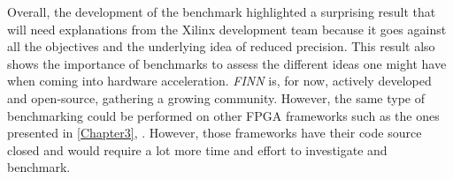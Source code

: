 Overall, the development of the benchmark highlighted a surprising result that will need explanations from the Xilinx development team because it goes against all the objectives and the underlying idea of reduced precision. This result also shows the importance of benchmarks to assess the different ideas one might have when coming into hardware acceleration. \emph{FINN} is, for now, actively developed and open-source, gathering a growing community. However, the same type of benchmarking could be performed on other FPGA frameworks such as the ones presented in \ref{Chapter3}, \cite{Andri2016, Zhao2016, Venieris2017, Ding2019, Jahanshahi2019}. However, those frameworks have their code source closed and would require a lot more time and effort to investigate and benchmark.
